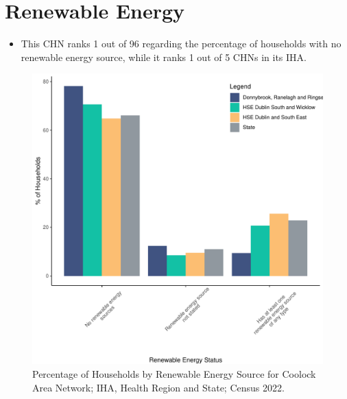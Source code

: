 \documentclass{article}
\begin{document}
\section{Renewable Energy}\label{sect:RE}
\begin{itemize}
\item This CHN ranks  1 out of 96 regarding the percentage of households with no renewable energy source, while it ranks   1 out of 5 CHNs in its IHA.
\end{itemize}
\begin{figure}[H]
	\centering
	\includegraphics[width = 140mm]{../figures/RenewableEnergyED.pdf}
	\caption{Percentage of Households by Renewable Energy Source for Coolock Area Network; IHA, Health Region and State; Census 2022.}
	\label{fig:vbnv}
	\end{figure}
\end{document}
